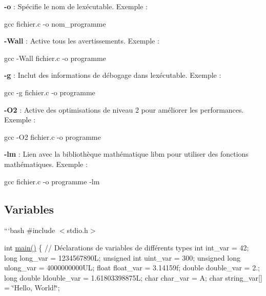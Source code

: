 \begin{DoxyItemize}
\item {\bfseries -\/o} \+: Spécifie le nom de l\textquotesingle{}exécutable. Exemple \+: 
\begin{DoxyCode}
gcc fichier.c -o nom\_programme
\end{DoxyCode}

\item {\bfseries -\/\+Wall} \+: Active tous les avertissements. Exemple \+: 
\begin{DoxyCode}
gcc -Wall fichier.c -o programme
\end{DoxyCode}

\item {\bfseries -\/g} \+: Inclut des informations de débogage dans l\textquotesingle{}exécutable. Exemple \+: 
\begin{DoxyCode}
gcc -g fichier.c -o programme
\end{DoxyCode}

\item {\bfseries -\/\+O2} \+: Active des optimisations de niveau 2 pour améliorer les performances. Exemple \+: 
\begin{DoxyCode}
gcc -O2 fichier.c -o programme
\end{DoxyCode}

\item {\bfseries -\/lm} \+: Lien avec la bibliothèque mathématique {\ttfamily libm} pour utiliser des fonctions mathématiques. Exemple \+: 
\begin{DoxyCode}
gcc fichier.c -o programme -lm
\end{DoxyCode}

\end{DoxyItemize}

\subsection*{Variables}

```bash \#include $<$stdio.\+h$>$

int \hyperlink{htop_8c_a3c04138a5bfe5d72780bb7e82a18e627}{main()} \{ // Déclarations de variables de différents types int int\+\_\+var = 42; long long\+\_\+var = 1234567890L; unsigned int uint\+\_\+var = 300; unsigned long ulong\+\_\+var = 4000000000\+UL; float float\+\_\+var = 3.\+14159f; double double\+\_\+var = 2.; long double ldouble\+\_\+var = 1.\+61803398875L; char char\+\_\+var = \textquotesingle{}A\textquotesingle{}; char string\+\_\+var\mbox{[}\mbox{]} = \char`\"{}\+Hello, World!\char`\"{};


